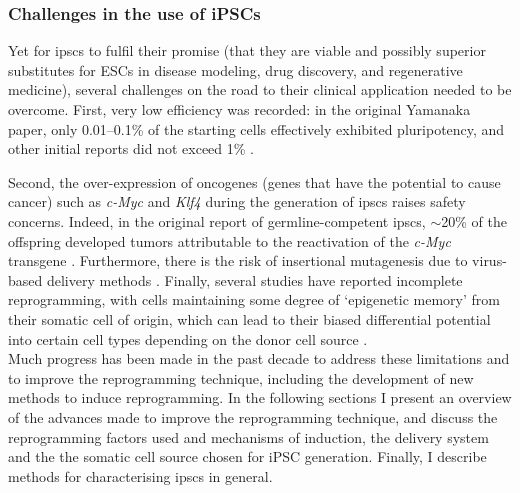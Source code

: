 
\subsubsection{Challenges in the use of iPSCs}
Yet for \glspl{ipsc} to fulfil their promise (that they are viable and possibly superior substitutes for ESCs in disease modeling, drug discovery, and regenerative medicine), several challenges on the road to their clinical application needed to be overcome.
First, very low efficiency was recorded: in the original Yamanaka paper, only 0.01–0.1\% \cite{takahashi2006induction} of the starting cells effectively exhibited pluripotency, and other initial reports did not exceed 1\% \cite{takahashi2007induction, okita2007generation, lowry2008generation}.

Second, the over-expression of oncogenes (genes that have the potential to cause cancer) such as \textit{c-Myc} and \textit{Klf4} during the generation of \glspl{ipsc} raises safety concerns.
Indeed, in the original report of germline-competent \glspl{ipsc}, $\sim$20\% of the offspring developed tumors attributable to the reactivation of the \textit{c-Myc} transgene \cite{okita2007generation}. 
Furthermore, there is the risk of insertional mutagenesis due to virus-based delivery methods \cite{takahashi2006induction, takahashi2007induction, yu2007induced}. 
Finally, several studies have reported incomplete reprogramming, with cells maintaining some degree of `epigenetic memory' from their somatic cell of origin, which can lead to their biased differential potential into certain cell types depending on the donor cell source \cite{kim2010epigenetic, polo2010cell}.\\

Much progress has been made in the past decade to address these limitations and to improve the reprogramming technique, including the development of new methods to induce reprogramming. 
In the following sections I present an overview of the advances made to improve the reprogramming technique, and discuss the reprogramming factors used and mechanisms of induction, the delivery system and the the somatic cell source chosen for iPSC generation.
Finally, I describe methods for characterising \glspl{ipsc} in general. 
